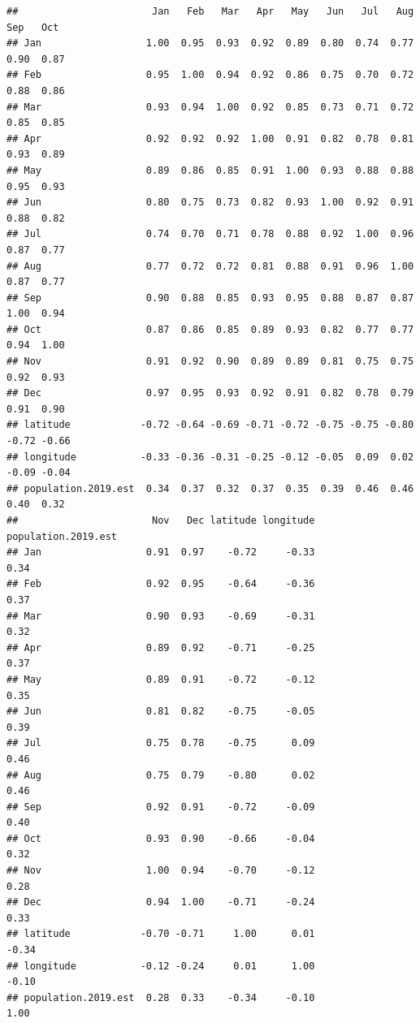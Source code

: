 \documentclass[
]{article}
\begin{document}
\begin{verbatim}
##                       Jan   Feb   Mar   Apr   May   Jun   Jul   Aug   Sep   Oct
## Jan                  1.00  0.95  0.93  0.92  0.89  0.80  0.74  0.77  0.90  0.87
## Feb                  0.95  1.00  0.94  0.92  0.86  0.75  0.70  0.72  0.88  0.86
## Mar                  0.93  0.94  1.00  0.92  0.85  0.73  0.71  0.72  0.85  0.85
## Apr                  0.92  0.92  0.92  1.00  0.91  0.82  0.78  0.81  0.93  0.89
## May                  0.89  0.86  0.85  0.91  1.00  0.93  0.88  0.88  0.95  0.93
## Jun                  0.80  0.75  0.73  0.82  0.93  1.00  0.92  0.91  0.88  0.82
## Jul                  0.74  0.70  0.71  0.78  0.88  0.92  1.00  0.96  0.87  0.77
## Aug                  0.77  0.72  0.72  0.81  0.88  0.91  0.96  1.00  0.87  0.77
## Sep                  0.90  0.88  0.85  0.93  0.95  0.88  0.87  0.87  1.00  0.94
## Oct                  0.87  0.86  0.85  0.89  0.93  0.82  0.77  0.77  0.94  1.00
## Nov                  0.91  0.92  0.90  0.89  0.89  0.81  0.75  0.75  0.92  0.93
## Dec                  0.97  0.95  0.93  0.92  0.91  0.82  0.78  0.79  0.91  0.90
## latitude            -0.72 -0.64 -0.69 -0.71 -0.72 -0.75 -0.75 -0.80 -0.72 -0.66
## longitude           -0.33 -0.36 -0.31 -0.25 -0.12 -0.05  0.09  0.02 -0.09 -0.04
## population.2019.est  0.34  0.37  0.32  0.37  0.35  0.39  0.46  0.46  0.40  0.32
##                       Nov   Dec latitude longitude population.2019.est
## Jan                  0.91  0.97    -0.72     -0.33                0.34
## Feb                  0.92  0.95    -0.64     -0.36                0.37
## Mar                  0.90  0.93    -0.69     -0.31                0.32
## Apr                  0.89  0.92    -0.71     -0.25                0.37
## May                  0.89  0.91    -0.72     -0.12                0.35
## Jun                  0.81  0.82    -0.75     -0.05                0.39
## Jul                  0.75  0.78    -0.75      0.09                0.46
## Aug                  0.75  0.79    -0.80      0.02                0.46
## Sep                  0.92  0.91    -0.72     -0.09                0.40
## Oct                  0.93  0.90    -0.66     -0.04                0.32
## Nov                  1.00  0.94    -0.70     -0.12                0.28
## Dec                  0.94  1.00    -0.71     -0.24                0.33
## latitude            -0.70 -0.71     1.00      0.01               -0.34
## longitude           -0.12 -0.24     0.01      1.00               -0.10
## population.2019.est  0.28  0.33    -0.34     -0.10                1.00
\end{verbatim}
\end{document}
